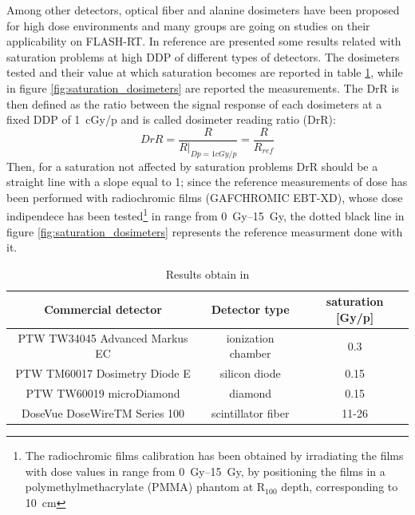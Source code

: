             Among  other detectors, optical fiber and alanine dosimeters have been proposed for high dose environments and many groups are going on studies on their applicability on FLASH-RT.  
            In reference \cite{FLASH_dosimeters} are presented some results related with saturation problems at high DDP of different types of detectors. The dosimeters tested and their value at which saturation becomes are reported in table \ref{tab:dosimeters_saturation}, while in figure \ref{fig:saturation_dosimeters} are reported the measurements. 
            The DrR is then defined as the ratio between the signal response of each dosimeters at a fixed DDP of \SI{1}{cGy/p} and is called dosimeter reading ratio (DrR): 
            \begin{equation}
                DrR = \frac{R}{R|_{Dp = 1cGy/p}} = \frac{R}{R_{ref}}
            \end{equation} 
            Then, for a saturation not affected by saturation problems DrR should be a straight line with a slope equal to 1; since the  reference measurements of dose has been performed with radiochromic films (GAFCHROMIC EBT-XD), whose dose indipendece has been tested\footnote{The radiochromic films calibration has been obtained by irradiating the films with dose values in range from \SIrange{0}{15}{Gy}, by positioning the films in a polymethylmethacrylate (PMMA) phantom at R$_{100}$ depth, corresponding to \SI{10}{cm}} in range from \SIrange{0}{15}{Gy}, the dotted black line in figure \ref{fig:saturation_dosimeters} represents the reference measurment done with it. 
            \begin{table}
                \begin{center}
                \begin{tabular}{|c | c |c |}
                \hline
                Commercial detector & Detector type & saturation [Gy/p]\\
                \hline
                \hline
                PTW TW34045 Advanced Markus EC & ionization chamber & 0.3 \\
                PTW TM60017 Dosimetry Diode E & silicon diode & 0.15\\
                PTW TW60019 microDiamond & diamond  &  0.15 \\
                DoseVue DoseWireTM Series 100 & scintillator fiber & 11-26\\
                \hline
                \end{tabular}
                \caption{Results obtain in \cite{FLASH_dosimeters}}
                \label{tab:dosimeters_saturation}
                \end{center}
            \end{table}
